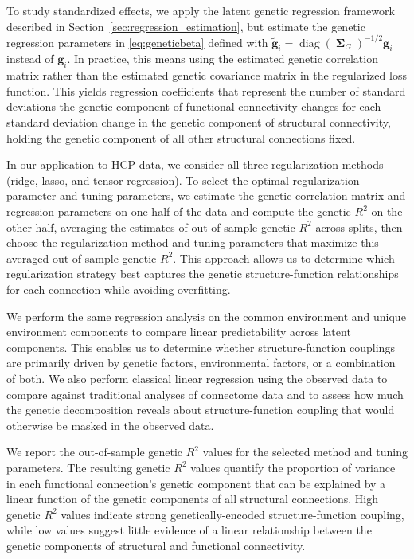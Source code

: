 \documentclass[12pt]{article}
\DeclareMathOperator{\bSigma}{\mathbf{\Sigma}}
\DeclareMathOperator{\diag}{diag}
\begin{document}
To study standardized effects, we apply the latent genetic regression framework described in Section~\ref{sec:regression_estimation}, but estimate the genetic regression parameters in \eqref{eq:geneticbeta} defined with $\tilde{\mathbf{g}}_i = \diag(\bSigma_G)^{-1/2} \mathbf{g}_i$ instead of $\mathbf{g}_i$. In practice, this means using the estimated genetic correlation matrix rather than the estimated genetic covariance matrix in the regularized loss function. This yields regression coefficients that represent the number of standard deviations the genetic component of functional connectivity changes for each standard deviation change in the genetic component of structural connectivity, holding the genetic component of all other structural connections fixed.

In our application to HCP data, we consider all three regularization methods (ridge, lasso, and tensor regression). To select the optimal regularization parameter and tuning parameters, we estimate the genetic correlation matrix and regression parameters on one half of the data and compute the genetic-$R^2$ on the other half, averaging the estimates of out-of-sample genetic-$R^2$ across splits, then choose the regularization method and tuning parameters that maximize this averaged out-of-sample genetic $R^2$. This approach allows us to determine which regularization strategy best captures the genetic structure-function relationships for each connection while avoiding overfitting.

We perform the same regression analysis on the common environment and unique environment components to compare linear predictability across latent components. This enables us to determine whether structure-function couplings are primarily driven by genetic factors, environmental factors, or a combination of both. We also perform classical linear regression using the observed data to compare against traditional analyses of connectome data and to assess how much the genetic decomposition reveals about structure-function coupling that would otherwise be masked in the observed data.

We report the out-of-sample genetic $R^2$ values for the selected method and tuning parameters. The resulting genetic $R^2$ values quantify the proportion of variance in each functional connection's genetic component that can be explained by a linear function of the genetic components of all structural connections. High genetic $R^2$ values indicate strong genetically-encoded structure-function coupling, while low values suggest little evidence of a linear relationship between the genetic components of structural and functional connectivity.
\end{document}
